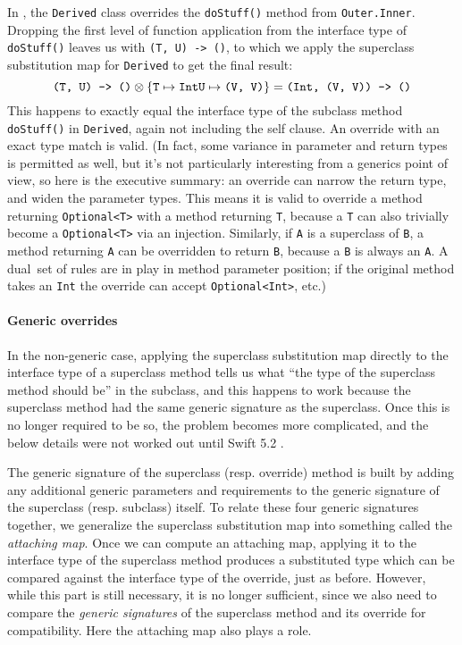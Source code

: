 \documentclass[../generics]{subfiles}
\begin{document}
In , the \texttt{Derived} class overrides the \texttt{doStuff()} method from \texttt{Outer.Inner}. Dropping the first level of function application from the interface type of \texttt{doStuff()} leaves us with \texttt{(T, U) -> ()}, to which we apply the superclass substitution map for \texttt{Derived} to get the final result:
\[
\texttt{(T, U) -> ()} \otimes
\{
\texttt{T} \mapsto \texttt{Int}\\
\texttt{U} \mapsto \texttt{(V, V)}
\} =
\texttt{(Int, (V, V)) -> ()}
\]
This happens to exactly equal the interface type of the subclass method \texttt{doStuff()} in \texttt{Derived}, again not including the self clause. An override with an exact type match is valid. (In fact, some variance in parameter and return types is permitted as well, but it's not particularly interesting from a generics point of view, so here is the executive summary: an override can narrow the return type, and widen the parameter types. This means it is valid to override a method returning \texttt{Optional<T>} with a method returning \texttt{T}, because a \texttt{T} can also trivially become a \texttt{Optional<T>} via an injection. Similarly, if \texttt{A} is a superclass of \texttt{B}, a method returning \texttt{A} can be overridden to return \texttt{B}, because a \texttt{B} is always an \texttt{A}. A dual set of rules are in play in method parameter position; if the original method takes an \texttt{Int} the override can accept \texttt{Optional<Int>}, etc.)

\paragraph{Generic overrides}
In the non-generic case, applying the superclass substitution map directly to the interface type of a superclass method tells us what ``the type of the superclass method should be'' in the subclass, and this happens to work because the superclass method had the same generic signature as the superclass. Once this is no longer required to be so, the problem becomes more complicated, and the below details were not worked out until Swift 5.2 \cite{sr4206}.

The generic signature of the superclass (resp. override) method is built by adding any additional generic parameters and requirements to the generic signature of the superclass (resp. subclass) itself. To relate these four generic signatures together, we generalize the superclass substitution map into something called the \emph{attaching map}. Once we can compute an attaching map, applying it to the interface type of the superclass method produces a substituted type which can be compared against the interface type of the override, just as before. However, while this part is still necessary, it is no longer sufficient, since we also need to compare the \emph{generic signatures} of the superclass method and its override for compatibility. Here the attaching map also plays a role.
\end{document}
